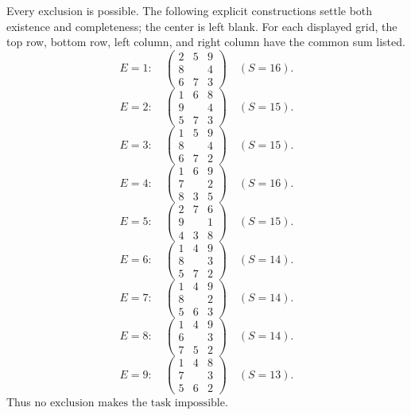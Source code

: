 Every exclusion is possible. The following explicit constructions settle both existence and completeness; the center is left blank. For each displayed grid, the top row, bottom row, left column, and right column have the common sum listed. \[E=1:\quad\begin{pmatrix}2&5&9\\8&\ &4\\6&7&3\end{pmatrix}\quad(S=16).\]\[E=2:\quad\begin{pmatrix}1&6&8\\9&\ &4\\5&7&3\end{pmatrix}\quad(S=15).\]\[E=3:\quad\begin{pmatrix}1&5&9\\8&\ &4\\6&7&2\end{pmatrix}\quad(S=15).\]\[E=4:\quad\begin{pmatrix}1&6&9\\7&\ &2\\8&3&5\end{pmatrix}\quad(S=16).\]\[E=5:\quad\begin{pmatrix}2&7&6\\9&\ &1\\4&3&8\end{pmatrix}\quad(S=15).\]\[E=6:\quad\begin{pmatrix}1&4&9\\8&\ &3\\5&7&2\end{pmatrix}\quad(S=14).\]\[E=7:\quad\begin{pmatrix}1&4&9\\8&\ &2\\5&6&3\end{pmatrix}\quad(S=14).\]\[E=8:\quad\begin{pmatrix}1&4&9\\6&\ &3\\7&5&2\end{pmatrix}\quad(S=14).\]\[E=9:\quad\begin{pmatrix}1&4&8\\7&\ &3\\5&6&2\end{pmatrix}\quad(S=13).\]Thus $\boxed{\text{no exclusion makes the task impossible}}$.
